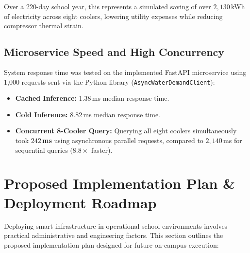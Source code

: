 \documentclass[conference]{IEEEtran}
\begin{document}
Over a 220-day school year, this represents a simulated saving of over $2,130$\,kWh of electricity across eight coolers, lowering utility expenses while reducing compressor thermal strain.

\subsection{Microservice Speed and High Concurrency}
System response time was tested on the implemented FastAPI microservice using 1,000 requests sent via the Python library (\texttt{AsyncWaterDemandClient}):
\begin{itemize}
    \item \textbf{Cached Inference:} $1.38$\,ms median response time.
    \item \textbf{Cold Inference:} $8.82$\,ms median response time.
    \item \textbf{Concurrent 8-Cooler Query:} Querying all eight coolers simultaneously took \textbf{$242$\,ms} using asynchronous parallel requests, compared to $2,140$\,ms for sequential queries ($8.8\times$ faster).
\end{itemize}

\section{Proposed Implementation Plan \& Deployment Roadmap}
Deploying smart infrastructure in operational school environments involves practical administrative and engineering factors. This section outlines the proposed implementation plan designed for future on-campus execution:
\end{document}
